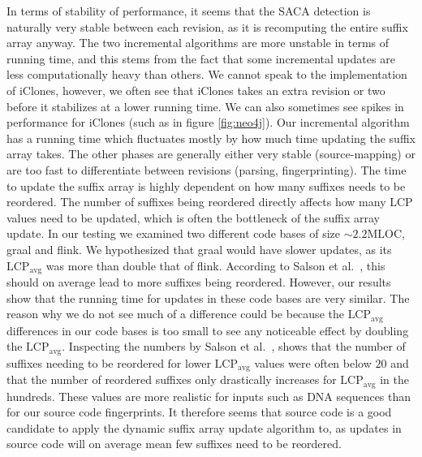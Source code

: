 In terms of stability of performance, it seems that the SACA detection is naturally very
stable between each revision, as it is recomputing the entire suffix array anyway. The two
incremental algorithms are more unstable in terms of running time, and this stems from the
fact that some incremental updates are less computationally heavy than others. We cannot
speak to the implementation of iClones, however, we often see that iClones takes an extra
revision or two before it stabilizes at a lower running time. We can also sometimes see
spikes in performance for iClones (such as in figure \ref{fig:neo4j}). Our incremental
algorithm has a running time which fluctuates mostly by how much time updating the suffix
array takes. The other phases are generally either very stable (source-mapping) or are too
fast to differentiate between revisions (parsing, fingerprinting). The time to update the
suffix array is highly dependent on how many suffixes needs to be reordered. The number of
suffixes being reordered directly affects how many LCP values need to be updated, which is
often the bottleneck of the suffix array update. In our testing we examined two different
code bases of size ${\sim}2.2\text{MLOC}$, graal and flink. We hypothesized that graal
would have slower updates, as its $\text{LCP}_\text{avg}$ was more than double that of
flink. According to Salson et al.~\cite{DynamicExtendedSuffixArraysReorderings}, this
should on average lead to more suffixes being reordered. However, our results show that
the running time for updates in these code bases are very similar. The reason why we do
not see much of a difference could be because the $\text{LCP}_\text{avg}$ differences in
our code bases is too small to see any noticeable effect by doubling the
$\text{LCP}_\text{avg}$. Inspecting the numbers by Salson et
al.~\cite{DynamicExtendedSuffixArraysReorderings}, shows that the number of suffixes
needing to be reordered for lower $\text{LCP}_\text{avg}$ values were often below $20$ and
that the number of reordered suffixes only drastically increases for
$\text{LCP}_\text{avg}$ in the hundreds. These values are more realistic for inputs such
as DNA sequences than for our source code fingerprints. It therefore seems that source
code is a good candidate to apply the dynamic suffix array update algorithm to, as updates
in source code will on average mean few suffixes need to be reordered.

